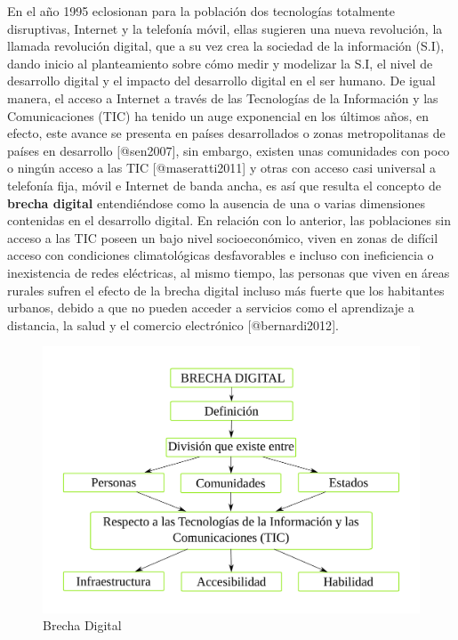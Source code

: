 \documentclass[]{article}
\begin{document}
En el año 1995 eclosionan para la población dos tecnologías totalmente
disruptivas, Internet y la telefonía móvil, ellas sugieren una nueva
revolución, la llamada revolución digital, que a su vez crea la sociedad
de la información (S.I), dando inicio al planteamiento sobre cómo medir
y modelizar la S.I, el nivel de desarrollo digital y el impacto del
desarrollo digital en el ser humano. De igual manera, el acceso a
Internet a través de las Tecnologías de la Información y las
Comunicaciones (TIC) ha tenido un auge exponencial en los últimos años,
en efecto, este avance se presenta en países desarrollados o zonas
metropolitanas de países en desarrollo {[}@sen2007{]}, sin embargo,
existen unas comunidades con poco o ningún acceso a las TIC
{[}@maseratti2011{]} y otras con acceso casi universal a telefonía fija,
móvil e Internet de banda ancha, es así que resulta el concepto de
\textbf{brecha digital} entendiéndose como la ausencia de una o varias
dimensiones contenidas en el desarrollo digital. En relación con lo
anterior, las poblaciones sin acceso a las TIC poseen un bajo nivel
socioeconómico, viven en zonas de difícil acceso con condiciones
climatológicas desfavorables e incluso con ineficiencia o inexistencia
de redes eléctricas, al mismo tiempo, las personas que viven en áreas
rurales sufren el efecto de la brecha digital incluso más fuerte que los
habitantes urbanos, debido a que no pueden acceder a servicios como el
aprendizaje a distancia, la salud y el comercio electrónico
{[}@bernardi2012{]}.

\begin{figure}
\centering
\includegraphics{imagen_brdigital.pdf}
\caption{Brecha Digital}
\end{figure}
\end{document}
